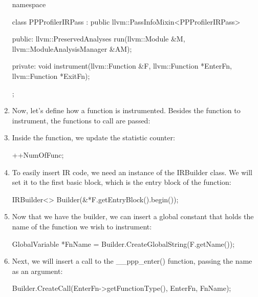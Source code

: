 \begin{enumerate}
\begin{cpp}
namespace {
class PPProfilerIRPass
: public llvm::PassInfoMixin<PPProfilerIRPass> {
public:
    llvm::PreservedAnalyses
    run(llvm::Module &M, llvm::ModuleAnalysisManager &AM);

private:
    void instrument(llvm::Function &F,
                    llvm::Function *EnterFn,
                    llvm::Function *ExitFn);
};
}
\end{cpp}

\item
Now, let’s define how a function is instrumented. Besides the function to instrument, the functions to call are passed:

\begin{cpp}
void PPProfilerIRPass::instrument(llvm::Function &F,
                                  Function *EnterFn,
                                  Function *ExitFn) {
\end{cpp}

\item
Inside the function, we update the statistic counter:

\begin{cpp}
    ++NumOfFunc;
\end{cpp}

\item
To easily insert IR code, we need an instance of the IRBuilder class. We will set it to the first basic block, which is the entry block of the function:

\begin{cpp}
    IRBuilder<> Builder(&*F.getEntryBlock().begin());
\end{cpp}

\item
Now that we have the builder, we can insert a global constant that holds the name of the function we wish to instrument:

\begin{cpp}
    GlobalVariable *FnName =
        Builder.CreateGlobalString(F.getName());
\end{cpp}

\item
Next, we will insert a call to the \_\_ppp\_enter() function, passing the name as an argument:

\begin{cpp}
    Builder.CreateCall(EnterFn->getFunctionType(), EnterFn,
                        {FnName});
\end{cpp}


\end{enumerate}

